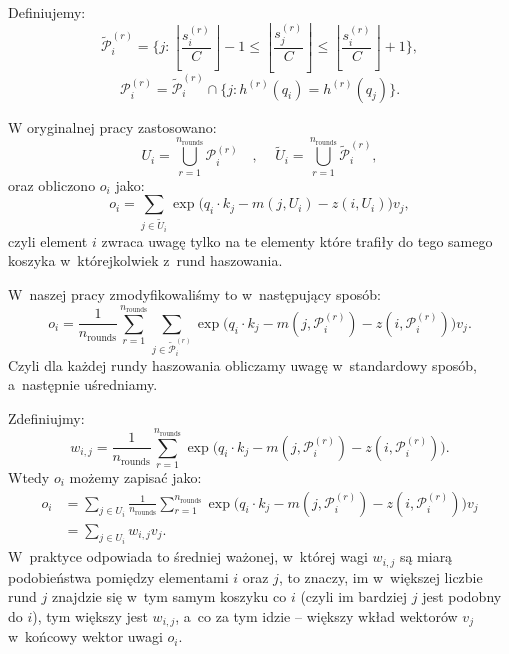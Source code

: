 \documentclass[a4paper,11pt,twoside]{report}
\theoremstyle{definition}
\begin{document}
Definiujemy:
\begin{equation}
\tilde{\mathcal{P}}_i^{(r)} =
\Big\{
j :
\left\lfloor \frac{s_i^{(r)}}{C} \right\rfloor - 1
\le
\left\lfloor \frac{s_j^{(r)}}{C} \right\rfloor
\le
\left\lfloor \frac{s_i^{(r)}}{C} \right\rfloor + 1
\Big\}
,
\end{equation}
\begin{equation}
\mathcal{P}_i^{(r)} = \tilde{\mathcal{P}}_i^{(r)} \cap \Big\{j : h^{(r)}(q_i) = h^{(r)}(q_j) \Big\}
.
\end{equation}

W oryginalnej pracy zastosowano:
\begin{equation}
U_i = \bigcup_{r=1}^{n_\text{rounds}} \mathcal{P}_i^{(r)}
\quad\text{, }\quad
\tilde{U}_i = \bigcup_{r=1}^{n_\text{rounds}} \tilde{\mathcal{P}}_i^{(r)}
,
\end{equation}
oraz obliczono $o_i$ jako:
\begin{equation}
o_i = \sum_{j \in \tilde{U}_i}
\exp\Big(q_i \cdot k_j - m(j, U_i) - z(i, U_i)\Big) v_j ,
\end{equation}
czyli element $i$ zwraca uwagę tylko na te elementy które trafiły do tego samego koszyka w~którejkolwiek z~rund haszowania.

W~naszej pracy zmodyfikowaliśmy to w~następujący sposób:
\begin{equation}
o_i = 
\frac{1}{n_\text{rounds}}
\sum_{r=1}^{n_\text{rounds}}
\sum_{j \in \tilde{\mathcal{P}}_i^{(r)}} 
\exp\Big(q_i \cdot k_j - m(j, \mathcal{P}_i^{(r)}) - z(i, \mathcal{P}_i^{(r)})\Big) v_j
.
\end{equation}
Czyli dla każdej rundy haszowania obliczamy uwagę w~standardowy sposób, a~następnie uśredniamy.

Zdefiniujmy:
\begin{equation}
w_{i,j} = \frac{1}{n_\text{rounds}} \sum_{r=1}^{n_\text{rounds}}
\exp\Big(q_i \cdot k_j - m(j, \mathcal{P}_i^{(r)}) - z(i, \mathcal{P}_i^{(r)})\Big)
.
\end{equation}
Wtedy $o_i$ możemy zapisać jako:
\begin{equation}
\begin{aligned}
o_i &= 
\sum_{j \in U_i}
\frac{1}{n_\text{rounds}}
\sum_{r=1}^{n_\text{rounds}}
\exp\Big(q_i \cdot k_j - m(j, \mathcal{P}_i^{(r)}) - z(i, \mathcal{P}_i^{(r)})\Big) v_j 
\\
&= \sum_{j \in U_i} w_{i,j} v_j
.
\end{aligned}
\end{equation}
W~praktyce odpowiada to średniej ważonej, w~której wagi $w_{i,j}$ są miarą podobieństwa pomiędzy elementami $i$ oraz $j$, to znaczy, im w~większej liczbie rund $j$ znajdzie się w~tym samym koszyku co $i$ (czyli im bardziej $j$ jest podobny do $i$), tym większy jest $w_{i,j}$, a~co za tym idzie -- większy wkład wektorów $v_j$ w~końcowy wektor uwagi $o_i$.
\end{document}
